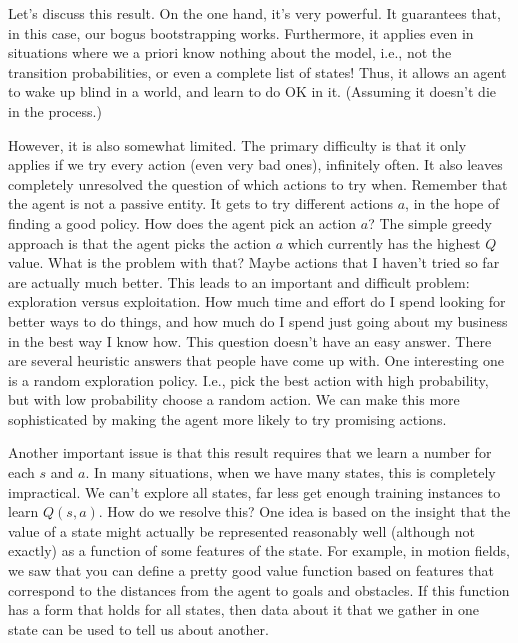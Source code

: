 Let's discuss this result.  On the one hand, it's very powerful.  It
guarantees that, in this case, our bogus bootstrapping works.  Furthermore,
it applies even in situations where we a priori know nothing about the
model, i.e., not the transition probabilities, or even a complete list of
states!  Thus, it allows an agent to wake up blind in a world, and learn to
do OK in it.  (Assuming it doesn't die in the process.) 

However, it is also somewhat limited.  The primary difficulty is that it
only applies if we try every action (even very bad ones), infinitely often.
It also leaves completely unresolved the question of which actions to try
when.  Remember that the agent is not a passive entity.  It gets to try
different actions $a$, in the hope of finding a good policy.  How does the
agent pick an action $a$?  The simple greedy approach is that the agent
picks the action $a$ which currently has the highest $Q$ value.  What is the
problem with that?  Maybe actions that I haven't tried so far are actually
much better.  This leads to an important and difficult problem: exploration
versus exploitation.  How much time and effort do I spend looking for better
ways to do things, and how much do I spend just going about my business in
the best way I know how. This question doesn't have an easy answer.  There
are several heuristic answers that people have come up with.  One
interesting one is a random exploration policy.  I.e., pick the best action
with high probability, but with low probability choose a random action.
We can make this more sophisticated by making the agent more
likely to try promising actions.

Another important issue is that this result requires that we learn a number
for each $s$ and $a$.  In many situations, when we have many states, this is
completely impractical.  We can't explore all states, far less get enough
training instances to learn $Q(s,a)$.  How do we resolve this?  One idea
is based on the insight that the value of a state might actually be
represented reasonably well (although not exactly) as a function of some
features of the state.  For example, in motion fields, we saw that you can
define a pretty good value function based on features that correspond to the
distances from the agent to goals and obstacles.  If this function has a
form that holds for all states, then data about it that we gather in one
state can be used to tell us about another.

